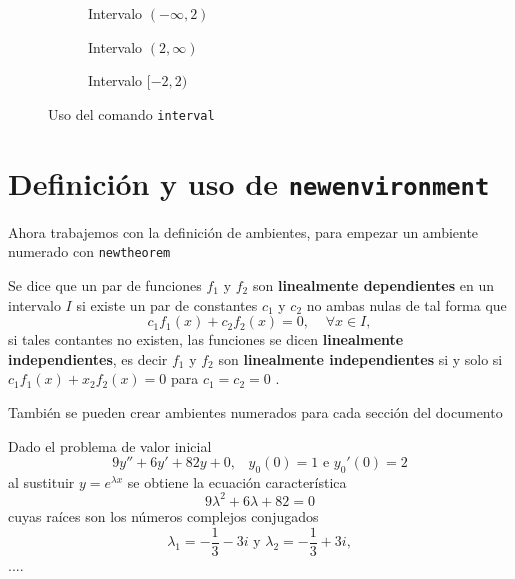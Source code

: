 \documentclass[10pt,a4paper]{article}
\begin{document}
\begin{figure}[ht]
	\centering
	\begin{subfigure}[t]{.47\textwidth}
	\centering
	\caption{Intervalo $(-\infty, 2)$}
	\end{subfigure}
	\hfill
	\begin{subfigure}[t]{.47\textwidth}
	\centering
	\caption{Intervalo $(2, \infty)$}
	\end{subfigure}
	\hfill
	\begin{subfigure}[t]{1\textwidth}
	\centering
	\caption{Intervalo $[-2,2)$}
	\end{subfigure}	
	\caption{Uso del comando \texttt{interval}}
\end{figure}

\section{Definición y uso de \texttt{newenvironment}}

Ahora trabajemos con la definición de ambientes, para empezar un ambiente numerado con \texttt{newtheorem}

\begin{definition}
Se dice que un par de funciones $f_1$ y $f_2$ son \textbf{linealmente dependientes} en un intervalo $I$ si existe un par de constantes $c_1$ y $c_2$ no ambas nulas de tal forma que
\[
	c_1f_1(x) + c_2f_2(x) = 0, \;\;\;\; \forall x \in I,
\]
si tales contantes no existen, las funciones se dicen \textbf{linealmente independientes}, es decir $f_1$ y $f_2$ son \textbf{linealmente independientes} si y solo si $c_1f_1(x) + x_2f_2(x) = 0$ para $c_1 = c_2 = 0$ .
\end{definition}

También se pueden crear ambientes numerados para cada sección del documento

\begin{ejemplo}
	Dado el problema de valor inicial
	\[
		9y'' + 6y' + 82y + 0, \;\;\; y_0(0) = 1 \text{ e } y_0'(0) = 2
	\]
	al sustituir $y = e^{\lambda x}$ se obtiene la ecuación característica
	\[
		9\lambda^2 + 6\lambda + 82 = 0
	\]
	cuyas raíces son los números complejos conjugados
	\[
		\lambda_1 = -\frac{1}{3} - 3i \text{ y } \lambda_2 = -\frac{1}{3} + 3i,
	\]
	....
\end{ejemplo}
\end{document}
